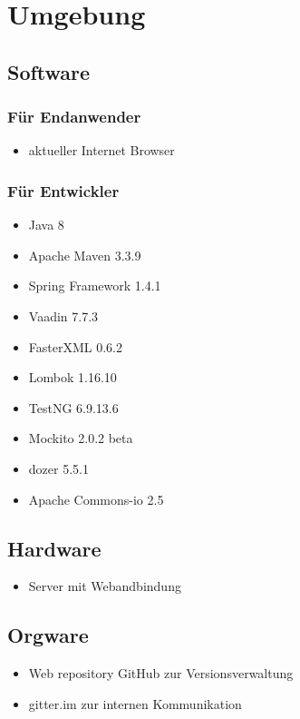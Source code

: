  
\chapter{Umgebung}
 
\section{Software}
\subsection {Für Endanwender}

\begin{itemize}
\item aktueller Internet Browser
\end{itemize}

\subsection	{Für Entwickler}

\begin{itemize}
\item Java 8
\item Apache Maven 3.3.9
\item Spring Framework 1.4.1
\item Vaadin 7.7.3
\item FasterXML 0.6.2
\item Lombok 1.16.10
\item TestNG 6.9.13.6
\item Mockito 2.0.2 beta
\item dozer 5.5.1
\item Apache Commons-io 2.5
\end{itemize}
 
\section{Hardware}

\begin{itemize}
\item Server mit Webandbindung
\end{itemize} 

\section{Orgware}
\begin{itemize}
\item Web repository GitHub zur Versionsverwaltung
\item gitter.im zur internen Kommunikation 
\end{itemize}
